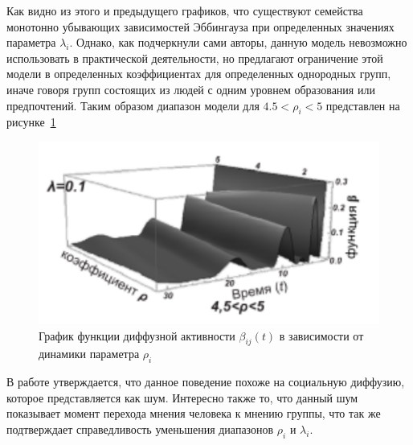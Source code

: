 Как видно из этого и предыдущего графиков, что существуют семейства монотонно убывающих зависимостей
Эббингауза при определенных значениях параметра $\lambda_{i}$.
Однако, как подчеркнули сами авторы, данную модель невозможно использовать в практической деятельности,
но предлагают ограничение этой модели в определенных коэффициентах для определенных однородных групп,
иначе говоря групп состоящих из людей с одним уровнем образования или предпочтений.
Таким образом диапазон модели для $4.5 < \rho_{i} < 5$ представлен на рисунке~\ref{fig:beta_4_5rho5}
\newpage
\begin{figure}[h!]
    \centering
    \captionsetup{justification=centering}
    \includegraphics[width=0.7\linewidth]{pictures/graphic_beta_45rho5.png}
    \caption{График функции диффузной активности $\beta_{ij}(t)$ в зависимости от динамики параметра $\rho_{i}$~\citep{pilkevich2015model}}
    \label{fig:beta_4_5rho5}
\end{figure}

В работе утверждается, что данное поведение похоже на социальную диффузию, которое представляется как
 шум\grqq.
Интересно также то, что данный шум показывает момент перехода мнения человека к мнению группы, что так
же подтверждает справедливость уменьшения диапазонов $\rho_{i}$ и $\lambda_{i}$.

